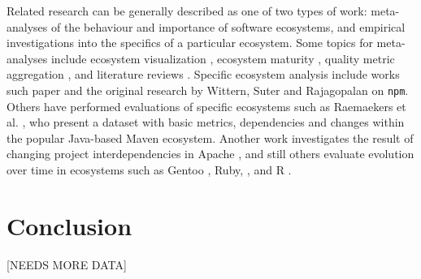\documentclass[10pt,conference]{IEEEtran}
\def\code#1{\texttt{#1}}
\begin{document}
Related research can be generally described as one of two types
of work: meta-analyses of the behaviour and importance
of software ecosystems, and empirical investigations into the
specifics of a particular ecosystem. Some topics 
for meta-analyses include ecosystem visualization \cite{LUNGU2010264},
ecosystem maturity \cite{Alves:2011}, quality metric aggregation \cite{Mordal:2013},
and literature reviews \cite{Manikas:2013, Manikas:2017}. Specific ecosystem analysis include works such
paper and the original research by Wittern, Suter and Rajagopalan \cite{Wittern:2016} on \code{npm}.
Others have performed evaluations of specific ecosystems such as Raemaekers et al. \cite{Raemaekers:2013},
who present a dataset with basic metrics, dependencies and changes within the popular 
Java-based Maven ecosystem. Another work investigates the
result of changing project interdependencies in Apache \cite{Bavota:2013}, 
and still others evaluate evolution over time in ecosystems such as
Gentoo \cite{Bloemen:2014}, Ruby, \cite{Kabbedijk:2011}, and R \cite{Plakidas:2017}.


\section{Conclusion}
[NEEDS MORE DATA]
\end{document}
